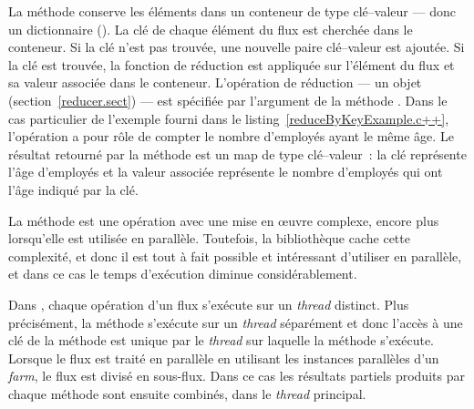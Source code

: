 La m\'ethode  conserve les \'el\'ements dans un conteneur de type cl\'e--valeur --- donc un dictionnaire (). La cl\'e de chaque \'el\'ement du flux est cherch\'ee dans le conteneur. Si la cl\'e n'est pas trouv\'ee, une nouvelle paire cl\'e--valeur est ajout\'ee. Si la cl\'e est trouv\'ee, la fonction de r\'eduction est appliqu\'ee sur l'\'el\'ement du flux et sa valeur associ\'ee dans le conteneur. L'op\'eration de r\'eduction --- un objet  (section~\ref{reducer.sect})  --- est sp\'ecifi\'ee par l'argument de la m\'ethode . Dans le cas particulier de l'exemple fourni dans le listing~\ref{reduceByKeyExample.c++}, l'op\'eration a pour r\^ole de compter le nombre d'employ\'es ayant le m\^eme \^age. Le r\'esultat retourn\'e par la m\'ethode  est un map de type cl\'e--valeur~: la cl\'e repr\'esente l'\^age d'employ\'es et la valeur associ\'ee repr\'esente le nombre d'employ\'es qui ont l'\^age indiqu\'e par la cl\'e.

La m\'ethode  est une op\'eration avec une mise en \oe{}uvre complexe, encore plus lorsqu'elle est utilis\'ee en parall\`ele. Toutefois, la biblioth\`eque  cache cette complexit\'e, et donc il est tout à fait possible et intéressant d'utiliser  en parall\`ele, et dans ce cas le temps d'ex\'ecution diminue consid\'erablement.



Dans , chaque op\'eration d'un flux s'ex\'ecute sur un \emph{thread} distinct. Plus pr\'ecisément, la m\'ethode  s'ex\'ecute sur un \emph{thread} s\'epar\'ement et donc l'acc\`es \`a une cl\'e de la m\'ethode est unique par le \emph{thread} sur laquelle la m\'ethode s'ex\'ecute. Lorsque le flux est trait\'e en parall\`ele en utilisant les instances parall\`eles d'un \emph{farm}, le flux est divis\'e en sous-flux. Dans ce cas les r\'esultats partiels produits par chaque m\'ethode  sont ensuite combin\'es, dans le \emph{thread} principal.



